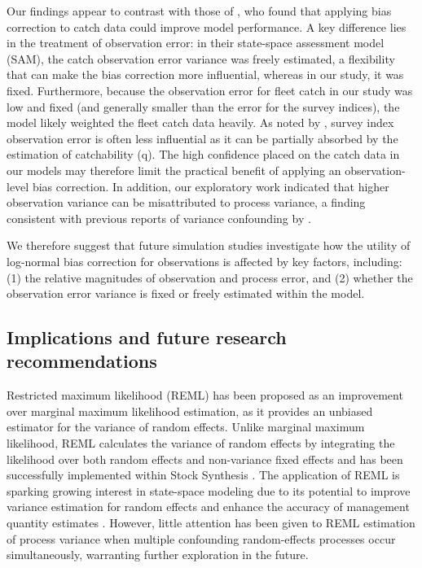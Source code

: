 \documentclass[
  12pt,
]{article}
\begin{document}
Our findings appear to contrast with those of \citet{aldrin2020}, who
found that applying bias correction to catch data could improve model
performance. A key difference lies in the treatment of observation
error: in their state-space assessment model (SAM), the catch
observation error variance was freely estimated, a flexibility that can
make the bias correction more influential, whereas in our study, it was
fixed. Furthermore, because the observation error for fleet catch in our
study was low and fixed (and generally smaller than the error for the
survey indices), the model likely weighted the fleet catch data heavily.
As noted by \citet{aldrin2020}, survey index observation error is often
less influential as it can be partially absorbed by the estimation of
catchability (q). The high confidence placed on the catch data in our
models may therefore limit the practical benefit of applying an
observation-level bias correction. In addition, our exploratory work
indicated that higher observation variance can be misattributed to
process variance, a finding consistent with previous reports of variance
confounding by \citet{Fisch2023}.

We therefore suggest that future simulation studies investigate how the
utility of log-normal bias correction for observations is affected by
key factors, including: (1) the relative magnitudes of observation and
process error, and (2) whether the observation error variance is fixed
or freely estimated within the model.

\hypertarget{implications-and-future-research-recommendations}{%
\subsection{Implications and future research
recommendations}\label{implications-and-future-research-recommendations}}

Restricted maximum likelihood (REML) has been proposed as an improvement
over marginal maximum likelihood estimation, as it provides an unbiased
estimator for the variance of random effects. Unlike marginal maximum
likelihood, REML calculates the variance of random effects by
integrating the likelihood over both random effects and non-variance
fixed effects and has been successfully implemented within Stock
Synthesis \citep{Thorson2015}. The application of REML is sparking
growing interest in state-space modeling due to its potential to improve
variance estimation for random effects and enhance the accuracy of
management quantity estimates \citep{Maunder2019, Thorson2019}. However,
little attention has been given to REML estimation of process variance
when multiple confounding random-effects processes occur simultaneously,
warranting further exploration in the future.
\end{document}
